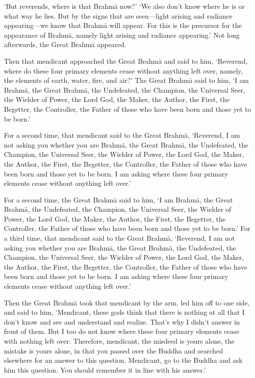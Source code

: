 \documentclass[12pt,openany]{book}%
\begin{document}
‘But reverends, where is that \textsanskrit{Brahmā} now?’ ‘We also don’t know where he is or what way he lies. But by the signs that are seen—light arising and radiance appearing—we know that \textsanskrit{Brahmā} will appear. For this is the precursor for the appearance of \textsanskrit{Brahmā}, namely light arising and radiance appearing.’ Not long afterwards, the Great \textsanskrit{Brahmā} appeared. 

Then that mendicant approached the Great \textsanskrit{Brahmā} and said to him, ‘Reverend, where do these four primary elements cease without anything left over, namely, the elements of earth, water, fire, and air?’ The Great \textsanskrit{Brahmā} said to him, ‘I am \textsanskrit{Brahmā}, the Great \textsanskrit{Brahmā}, the Undefeated, the Champion, the Universal Seer, the Wielder of Power, the Lord God, the Maker, the Author, the First, the Begetter, the Controller, the Father of those who have been born and those yet to be born.’ 

For a second time, that mendicant said to the Great \textsanskrit{Brahmā}, ‘Reverend, I am not asking you whether you are \textsanskrit{Brahmā}, the Great \textsanskrit{Brahmā}, the Undefeated, the Champion, the Universal Seer, the Wielder of Power, the Lord God, the Maker, the Author, the First, the Begetter, the Controller, the Father of those who have been born and those yet to be born. I am asking where these four primary elements cease without anything left over.’ 

For a second time, the Great \textsanskrit{Brahmā} said to him, ‘I am \textsanskrit{Brahmā}, the Great \textsanskrit{Brahmā}, the Undefeated, the Champion, the Universal Seer, the Wielder of Power, the Lord God, the Maker, the Author, the First, the Begetter, the Controller, the Father of those who have been born and those yet to be born.’ For a third time, that mendicant said to the Great \textsanskrit{Brahmā}, ‘Reverend, I am not asking you whether you are \textsanskrit{Brahmā}, the Great \textsanskrit{Brahmā}, the Undefeated, the Champion, the Universal Seer, the Wielder of Power, the Lord God, the Maker, the Author, the First, the Begetter, the Controller, the Father of those who have been born and those yet to be born. I am asking where these four primary elements cease without anything left over.’ 

Then the Great \textsanskrit{Brahmā} took that mendicant by the arm, led him off to one side, and said to him, ‘Mendicant, these gods think that there is nothing at all that I don’t know and see and understand and realize. That’s why I didn’t answer in front of them. But I too do not know where these four primary elements cease with nothing left over. Therefore, mendicant, the misdeed is yours alone, the mistake is yours alone, in that you passed over the Buddha and searched elsewhere for an answer to this question. Mendicant, go to the Buddha and ask him this question. You should remember it in line with his answer.’ 
\end{document}
